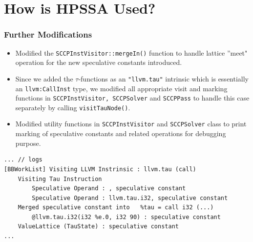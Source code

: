 \documentclass{beamer}
\begin{document}
\section{How is HPSSA Used?}

\begin{frame}[fragile]
	\frametitle{Further Modifications}
	\begin{itemize}
		\item Modified the \texttt{SCCPInstVisitor::mergeIn()} function to handle lattice ''meet" operation for the new speculative constants introduced.  
		\item Since we added the $\tau$-functions as an \texttt{"llvm.tau"} intrinsic which is essentially an \texttt{llvm:CallInst} type, we modified all appropriate visit and marking functions in \texttt{SCCPInstVisitor, SCCPSolver} and \texttt{SCCPPass} to handle this case separately by calling \texttt{visitTauNode()}.
		\item Modified utility functions in \texttt{SCCPInstVisitor} and \texttt{SCCPSolver} class to print marking of speculative constants and related operations for debugging purpose.
	\end{itemize}
\begin{verbatim}
... // logs
[BBWorkList] Visiting LLVM Instrinsic : llvm.tau (call)
	Visiting Tau Instruction
		Speculative Operand : , speculative constant
		Speculative Operand : llvm.tau.i32, speculative constant
	Merged speculative constant into   %tau = call i32 (...) 
		@llvm.tau.i32(i32 %e.0, i32 90) : speculative constant
	ValueLattice (TauState) : speculative constant
...
\end{verbatim}
\end{frame}
\footnotesize
\end{document}
